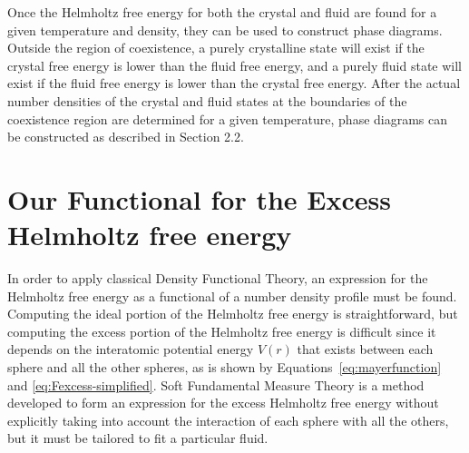 \documentclass[double,12pt]{beavtex}
\begin{document}
Once the Helmholtz free energy for both the crystal and fluid 
are found for a given temperature and density, they can be 
used to construct phase diagrams.
Outside the region of coexistence, a purely crystalline state will exist 
if the crystal free energy is lower than the fluid free energy, and 
a purely fluid state will exist if the fluid free energy is lower than 
the crystal free energy. 
After the actual number densities of the crystal and fluid states
at the boundaries of the coexistence region are determined for a given 
temperature, phase diagrams can be constructed as described in Section 2.2.

\section{Our Functional for the Excess Helmholtz free energy}
In order to apply classical Density Functional Theory, an expression 
for the Helmholtz free energy as a functional of a number density profile 
must be found. Computing the ideal portion of the 
Helmholtz free energy is straightforward, but computing the excess portion 
of the Helmholtz free energy is difficult since it depends on the interatomic 
potential energy $V(r)$ that exists between each sphere and all the other spheres, 
as is shown by Equations~\ref{eq:mayerfunction} and \ref{eq:Fexcess-simplified}.
Soft Fundamental Measure Theory is a method
developed to form an expression for the excess Helmholtz free energy without
explicitly taking into account the interaction of each sphere with all the others, 
but it must be tailored to fit a particular fluid\cite{schmidt1999density}.  
\end{document}
